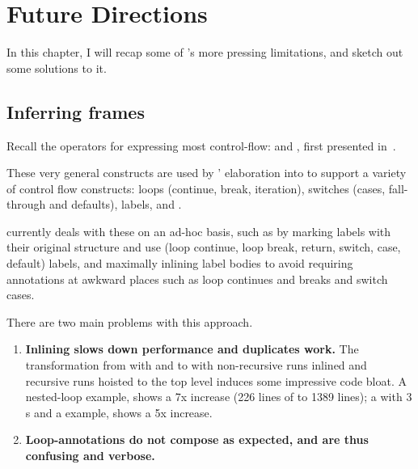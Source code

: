 
\chapter{Future Directions}%
\label{chap:future-directions}

\margintoc{}

In this chapter, I will recap some of 's more pressing limitations, and
sketch out some solutions to it.

\section{Inferring frames}

Recall the  operators for expressing most control-flow:
 and , first presented %
in~.

These very general constructs are used by ' elaboration into
 to support a variety of control flow constructs: loops (continue,
break, iteration), switches (cases, fall-through and defaults), labels, and
.

 currently deals with these on an ad-hoc basis, such as by marking
labels with their original structure and use (loop continue, loop break,
return, switch, case, default) labels, and maximally inlining label bodies to
avoid requiring annotations at awkward places such as loop continues and breaks
and switch cases.

There are two main problems with this approach.

\begin{enumerate}
    \item \textbf{Inlining slows down performance and duplicates
        work.}
        The transformation from  with   %
        and to  with non-recursive runs %
        inlined and recursive runs hoisted to the top level induces some
        impressive code bloat. A nested-loop
        example,
        shows a 7x increase (226 lines of  to 1389 lines); a
         with 3 s and a 
        example, shows a 5x increase.
    \item \textbf{Loop-annotations do not compose as expected, and are thus confusing and
        verbose.}
\end{enumerate}

